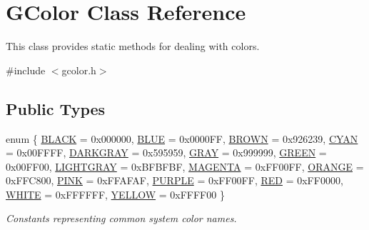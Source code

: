 \hypertarget{classGColor}{}\section{G\+Color Class Reference}
\label{classGColor}


This class provides static methods for dealing with colors.  




{\ttfamily \#include $<$gcolor.\+h$>$}

\subsection*{Public Types}
\begin{DoxyCompactItemize}
\item 
enum \{ \mbox{\hyperlink{classGColor_a06fc87d81c62e9abb8790b6e5713c55baf77fb67151d0c18d397069ad8c271ba3}{B\+L\+A\+CK}} = 0x000000, 
\mbox{\hyperlink{classGColor_a06fc87d81c62e9abb8790b6e5713c55ba35d6719cb4d7577c031b3d79057a1b79}{B\+L\+UE}} = 0x0000\+FF, 
\mbox{\hyperlink{classGColor_a06fc87d81c62e9abb8790b6e5713c55ba1fa14482e7e4dc1332ab8c9d995fe570}{B\+R\+O\+WN}} = 0x926239, 
\mbox{\hyperlink{classGColor_a06fc87d81c62e9abb8790b6e5713c55baafe71cad474c15ce63b300c470eef8cc}{C\+Y\+AN}} = 0x00\+F\+F\+FF, 
\mbox{\hyperlink{classGColor_a06fc87d81c62e9abb8790b6e5713c55ba52a9af0edd45f66d37996edcb1ca69f0}{D\+A\+R\+K\+G\+R\+AY}} = 0x595959, 
\mbox{\hyperlink{classGColor_a06fc87d81c62e9abb8790b6e5713c55ba3fb6c4ad00f4ad98553e01229d1803ac}{G\+R\+AY}} = 0x999999, 
\mbox{\hyperlink{classGColor_a06fc87d81c62e9abb8790b6e5713c55baa60bd322f93178d68184e30e162571ca}{G\+R\+E\+EN}} = 0x00\+F\+F00, 
\mbox{\hyperlink{classGColor_a06fc87d81c62e9abb8790b6e5713c55ba3dcbd50f6d434719ddfb9da673977307}{L\+I\+G\+H\+T\+G\+R\+AY}} = 0x\+B\+F\+B\+F\+BF, 
\mbox{\hyperlink{classGColor_a06fc87d81c62e9abb8790b6e5713c55ba56926c820ad72d0977e7ee44d9916e62}{M\+A\+G\+E\+N\+TA}} = 0x\+F\+F00\+FF, 
\mbox{\hyperlink{classGColor_a06fc87d81c62e9abb8790b6e5713c55bace9ee4c1a6b777940c7f3a766a9a88d4}{O\+R\+A\+N\+GE}} = 0x\+F\+F\+C800, 
\mbox{\hyperlink{classGColor_a06fc87d81c62e9abb8790b6e5713c55ba186598537092d140eaa60720ec7e0821}{P\+I\+NK}} = 0x\+F\+F\+A\+F\+AF, 
\mbox{\hyperlink{classGColor_a06fc87d81c62e9abb8790b6e5713c55ba2772ad7cd64f03c2aed60f91c69fa69d}{P\+U\+R\+P\+LE}} = 0x\+F\+F00\+FF, 
\mbox{\hyperlink{classGColor_a06fc87d81c62e9abb8790b6e5713c55baf80f9a890089d211842d59625e561f88}{R\+ED}} = 0x\+F\+F0000, 
\mbox{\hyperlink{classGColor_a06fc87d81c62e9abb8790b6e5713c55ba283fc479650da98250635b9c3c0e7e50}{W\+H\+I\+TE}} = 0x\+F\+F\+F\+F\+FF, 
\mbox{\hyperlink{classGColor_a06fc87d81c62e9abb8790b6e5713c55bae735a848bf82163a19236ead1c3ef2d2}{Y\+E\+L\+L\+OW}} = 0x\+F\+F\+F\+F00
 \}
\begin{DoxyCompactList}\small\item\em Constants representing common system color names. \end{DoxyCompactList}\end{DoxyCompactItemize}
